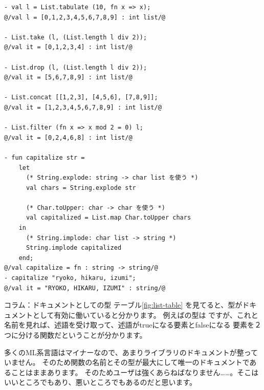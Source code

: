 \documentclass[11pt,a4paper]{article}
\begin{document}
\begin{lstlisting}[caption=Listモジュール,label=code:list-mod]
- val l = List.tabulate (10, fn x => x);
@/val l = [0,1,2,3,4,5,6,7,8,9] : int list/@

- List.take (l, (List.length l div 2));
@/val it = [0,1,2,3,4] : int list/@

- List.drop (l, (List.length l div 2));
@/val it = [5,6,7,8,9] : int list/@

- List.concat [[1,2,3], [4,5,6], [7,8,9]];
@/val it = [1,2,3,4,5,6,7,8,9] : int list/@

- List.filter (fn x => x mod 2 = 0) l;
@/val it = [0,2,4,6,8] : int list/@

- fun capitalize str =
    let
      (* String.explode: string -> char list を使う *)
      val chars = String.explode str

      (* Char.toUpper: char -> char を使う *)
      val capitalized = List.map Char.toUpper chars
    in
      (* String.implode: char list -> string *)
      String.implode capitalized
    end;
@/val capitalize = fn : string -> string/@
- capitalize "ryoko, hikaru, izumi";
@/val it = "RYOKO, HIKARU, IZUMI" : string/@
\end{lstlisting}

\begin{itembox}[l]{コラム：ドキュメントとしての型}
テーブル\ref{fig:list-table} を見てると、型がドキュメントとして有効に働いていると分かります。
例えばの型は
ですが、これと名前を見れば、述語を受け取って、述語がtrueになる要素とfalseになる
要素を２つに分ける関数だということが分かります。

多くのML系言語はマイナーなので、あまりライブラリのドキュメントが整っていません。
そのため関数の名前とその型が最大にして唯一のドキュメントであることはままあります。
そのためユーザは強くあらねばなりません……。そこはいいところでもあり、悪いところでもあるのだと思います。
\end{itembox}
\end{document}
